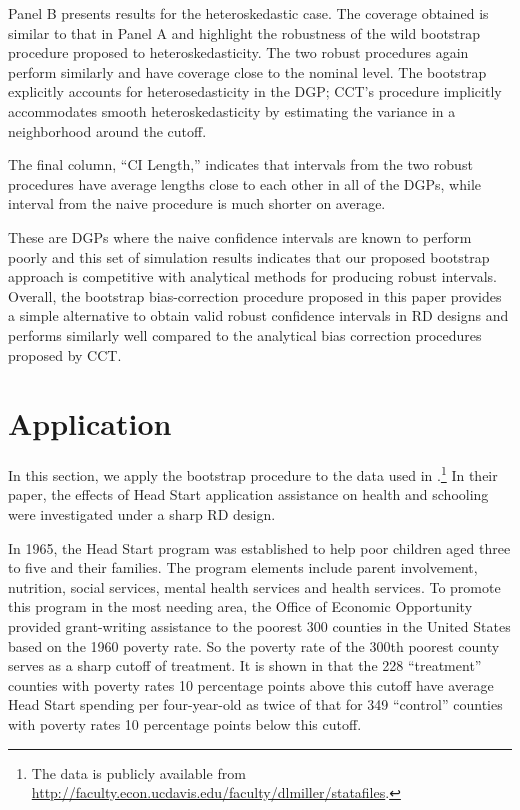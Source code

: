 \documentclass[12pt,fleqn]{article}
\begin{document}
Panel B presents results for the heteroskedastic case. The coverage obtained is similar to that in Panel A and highlight
the robustness of the wild bootstrap procedure proposed to heteroskedasticity. The two robust procedures again perform
similarly and have coverage close to the nominal level. The bootstrap explicitly
accounts for heterosedasticity in the DGP; CCT's procedure implicitly accommodates
smooth heteroskedasticity by estimating the variance in a neighborhood around
the cutoff.

The final column, ``CI Length,'' indicates that intervals from the
two robust procedures have average lengths close to each other in all of the DGPs,
while interval from the naive procedure is much shorter on average.

These are DGPs where the naive confidence intervals are known to perform poorly
and this set of simulation results indicates that our proposed bootstrap approach is 
competitive with analytical methods for producing robust intervals.
Overall, the bootstrap bias-correction procedure proposed in this paper provides a simple alternative to obtain valid robust confidence intervals in RD designs
and performs similarly well compared to the analytical bias correction procedures proposed by CCT.


\section{Application}\label{application}

In this section, we apply the bootstrap procedure to the data used in
\cite{ludwig2007}.\footnote{%
  The data is publicly available from
  \url{http://faculty.econ.ucdavis.edu/faculty/dlmiller/statafiles}.} %
In their paper, the effects of Head Start application assistance on health and
schooling were investigated under a sharp RD design.

In 1965, the Head Start program was established to help poor children aged three
to five and their families. The program elements include parent involvement,
nutrition, social services, mental health services and health services. To
promote this program in the most needing area, the Office of Economic
Opportunity provided grant-writing assistance to the poorest 300 counties in the
United States based on the 1960 poverty rate. So the poverty rate of the 300th
poorest county serves as a sharp cutoff of treatment. It is shown in
\cite{ludwig2007} that the 228 ``treatment'' counties with poverty rates 10
percentage points above this cutoff have average Head Start spending per
four-year-old as twice of that for 349 ``control'' counties with poverty rates
10 percentage points below this cutoff.
\end{document}
